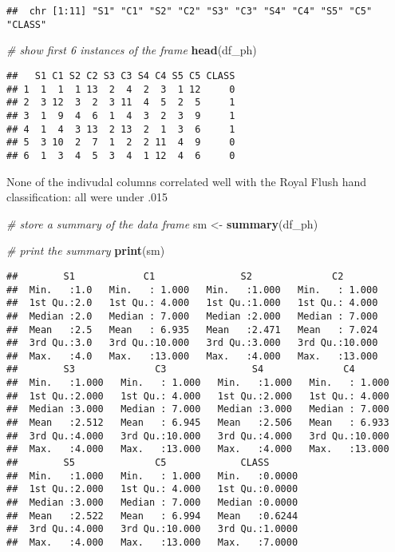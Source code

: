 \documentclass[]{article}
\newenvironment{Shaded}{\begin{snugshade}}{\end{snugshade}}
\newcommand{\KeywordTok}[1]{\textcolor[rgb]{0.13,0.29,0.53}{\textbf{#1}}}
\newcommand{\StringTok}[1]{\textcolor[rgb]{0.31,0.60,0.02}{#1}}
\newcommand{\CommentTok}[1]{\textcolor[rgb]{0.56,0.35,0.01}{\textit{#1}}}
\newcommand{\NormalTok}[1]{#1}
\begin{document}
\begin{verbatim}
##  chr [1:11] "S1" "C1" "S2" "C2" "S3" "C3" "S4" "C4" "S5" "C5" "CLASS"
\end{verbatim}

\begin{Shaded}
\begin{Highlighting}[]
\CommentTok{# show first 6 instances of the frame}
\KeywordTok{head}\NormalTok{(df_ph)}
\end{Highlighting}
\end{Shaded}

\begin{verbatim}
##   S1 C1 S2 C2 S3 C3 S4 C4 S5 C5 CLASS
## 1  1  1  1 13  2  4  2  3  1 12     0
## 2  3 12  3  2  3 11  4  5  2  5     1
## 3  1  9  4  6  1  4  3  2  3  9     1
## 4  1  4  3 13  2 13  2  1  3  6     1
## 5  3 10  2  7  1  2  2 11  4  9     0
## 6  1  3  4  5  3  4  1 12  4  6     0
\end{verbatim}

None of the indivudal columns correlated well with the Royal Flush hand
classification: all were under .015

\begin{Shaded}
\begin{Highlighting}[]
\CommentTok{# store a summary of the data frame}
\NormalTok{sm <-}\StringTok{ }\KeywordTok{summary}\NormalTok{(df_ph)}

\CommentTok{# print the summary}
\KeywordTok{print}\NormalTok{(sm)}
\end{Highlighting}
\end{Shaded}

\begin{verbatim}
##        S1            C1               S2              C2        
##  Min.   :1.0   Min.   : 1.000   Min.   :1.000   Min.   : 1.000  
##  1st Qu.:2.0   1st Qu.: 4.000   1st Qu.:1.000   1st Qu.: 4.000  
##  Median :2.0   Median : 7.000   Median :2.000   Median : 7.000  
##  Mean   :2.5   Mean   : 6.935   Mean   :2.471   Mean   : 7.024  
##  3rd Qu.:3.0   3rd Qu.:10.000   3rd Qu.:3.000   3rd Qu.:10.000  
##  Max.   :4.0   Max.   :13.000   Max.   :4.000   Max.   :13.000  
##        S3              C3               S4              C4        
##  Min.   :1.000   Min.   : 1.000   Min.   :1.000   Min.   : 1.000  
##  1st Qu.:2.000   1st Qu.: 4.000   1st Qu.:2.000   1st Qu.: 4.000  
##  Median :3.000   Median : 7.000   Median :3.000   Median : 7.000  
##  Mean   :2.512   Mean   : 6.945   Mean   :2.506   Mean   : 6.933  
##  3rd Qu.:4.000   3rd Qu.:10.000   3rd Qu.:4.000   3rd Qu.:10.000  
##  Max.   :4.000   Max.   :13.000   Max.   :4.000   Max.   :13.000  
##        S5              C5             CLASS       
##  Min.   :1.000   Min.   : 1.000   Min.   :0.0000  
##  1st Qu.:2.000   1st Qu.: 4.000   1st Qu.:0.0000  
##  Median :3.000   Median : 7.000   Median :0.0000  
##  Mean   :2.522   Mean   : 6.994   Mean   :0.6244  
##  3rd Qu.:4.000   3rd Qu.:10.000   3rd Qu.:1.0000  
##  Max.   :4.000   Max.   :13.000   Max.   :7.0000
\end{verbatim}
\end{document}
